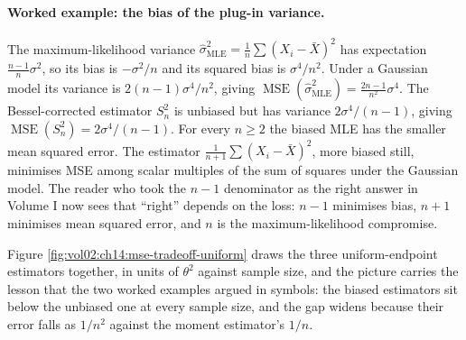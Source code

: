 \paragraph{Worked example: the bias of the plug-in variance.}
The maximum-likelihood variance $\hat{\sigma}^{2}_{\mathrm{MLE}}
= \frac{1}{n}\sum(X_{i} - \bar{X})^{2}$ has expectation
$\frac{n-1}{n}\sigma^{2}$, so its bias is $-\sigma^{2}/n$ and its
squared bias is $\sigma^{4}/n^{2}$. Under a Gaussian model its
variance is $2(n-1)\sigma^{4}/n^{2}$, giving
$\operatorname{MSE}(\hat{\sigma}^{2}_{\mathrm{MLE}}) =
\frac{2n-1}{n^{2}}\sigma^{4}$. The Bessel-corrected estimator
$S_{n}^{2}$ is unbiased but has variance $2\sigma^{4}/(n-1)$,
giving $\operatorname{MSE}(S_{n}^{2}) = 2\sigma^{4}/(n-1)$. For
every $n \geq 2$ the biased MLE has the smaller mean squared error.
The estimator $\frac{1}{n+1}\sum(X_{i}-\bar{X})^{2}$, more biased
still, minimises MSE among scalar multiples of the sum of squares
under the Gaussian model. The reader who took the $n-1$ denominator
as the right answer in Volume I now sees that ``right'' depends on
the loss: $n-1$ minimises bias, $n+1$ minimises mean squared error,
and $n$ is the maximum-likelihood compromise.

Figure \ref{fig:vol02:ch14:mse-tradeoff-uniform} draws the three
uniform-endpoint estimators together, in units of $\theta^{2}$ against
sample size, and the picture carries the lesson that the two worked
examples argued in symbols: the biased estimators sit below the
unbiased one at every sample size, and the gap widens because their
error falls as $1/n^{2}$ against the moment estimator's $1/n$.



